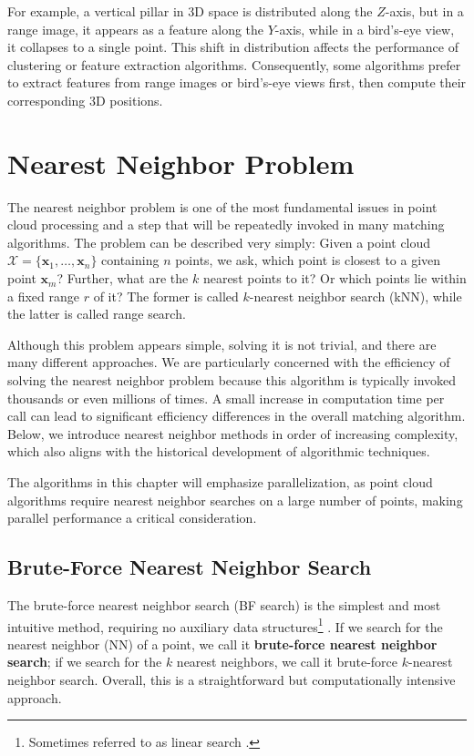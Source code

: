 For example, a vertical pillar in 3D space is distributed along the $Z$-axis, but in a range image, it appears as a feature along the $Y$-axis, while in a bird's-eye view, it collapses to a single point. This shift in distribution affects the performance of clustering or feature extraction algorithms. Consequently, some algorithms prefer to extract features from range images or bird's-eye views first, then compute their corresponding 3D positions.

\section{Nearest Neighbor Problem}
The nearest neighbor problem is one of the most fundamental issues in point cloud processing and a step that will be repeatedly invoked in many matching algorithms. The problem can be described very simply: Given a point cloud $\mathcal{X} = \{ \mathbf{x}_1, \ldots, \mathbf{x}_n\}$ containing $n$ points, we ask, which point is closest to a given point $\mathbf{x}_m$? Further, what are the $k$ nearest points to it? Or which points lie within a fixed range $r$ of it? The former is called $k$-nearest neighbor search (kNN), while the latter is called range search.  

Although this problem appears simple, solving it is not trivial, and there are many different approaches. We are particularly concerned with the efficiency of solving the nearest neighbor problem because this algorithm is typically invoked thousands or even millions of times. A small increase in computation time per call can lead to significant efficiency differences in the overall matching algorithm. Below, we introduce nearest neighbor methods in order of increasing complexity, which also aligns with the historical development of algorithmic techniques.  

The algorithms in this chapter will emphasize parallelization, as point cloud algorithms require nearest neighbor searches on a large number of points, making parallel performance a critical consideration.  

\subsection{Brute-Force Nearest Neighbor Search}  
The brute-force nearest neighbor search (BF search) is the simplest and most intuitive method, requiring no auxiliary data structures\footnote{Sometimes referred to as linear search \cite{Weber1998}.} \cite{Kuang2009}. If we search for the nearest neighbor (NN) of a point, we call it \textbf{brute-force nearest neighbor search}; if we search for the $k$ nearest neighbors, we call it brute-force $k$-nearest neighbor search. Overall, this is a straightforward but computationally intensive approach.  

